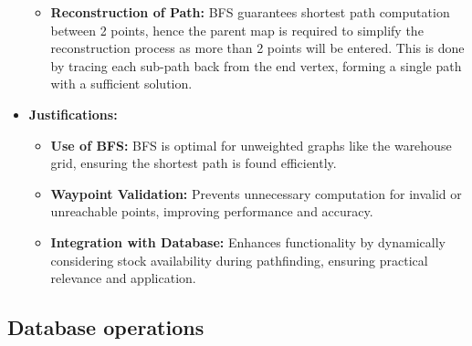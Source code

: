 \begin{itemize}
\begin{itemize}
        \item \textbf{Reconstruction of Path:} BFS guarantees shortest path computation between 2 points, hence the parent map is required to simplify the reconstruction process as more than 2 points will be entered. This is done by tracing each sub-path back from the end vertex, forming a single path with a sufficient solution.
    \end{itemize}
    \item \textbf{Justifications:}
    \begin{itemize}
        \item \textbf{Use of BFS:} BFS is optimal for unweighted graphs like the warehouse grid, ensuring the shortest path is found efficiently.
        \item \textbf{Waypoint Validation:} Prevents unnecessary computation for invalid or unreachable points, improving performance and accuracy.
        \item \textbf{Integration with Database:} Enhances functionality by dynamically considering stock availability during pathfinding, ensuring practical relevance and application.
    \end{itemize}
    
\end{itemize}

\newpage

\subsection{Database operations}

